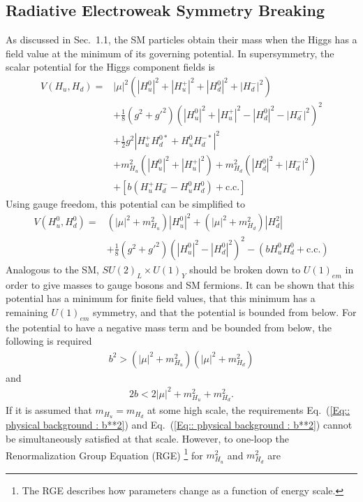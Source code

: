 \documentclass[twoside,english]{uiofysmaster}
\begin{document}
\subsection{Radiative Electroweak Symmetry Breaking}

As discussed in Sec.\ 1.1, the SM particles obtain their mass when the Higgs has a field value at the minimum of its governing potential. In supersymmetry, the scalar potential for the Higgs component fields is
\begin{align}
V(H_u, H_d) =& |\mu|^2 (|H_u^0|^2 + |H_u^+|^2 + |H_d^0|^2 + |H_d^-|^2) \nonumber \\
&+ \frac{1}{8} (g^2+{g'}^2)(|H_u^0|^2 + |H_u^+|^2 - |H_d^0|^2 - |H_d^-|^2)^2 \nonumber \\
&+ \frac{1}{2} g^2 |H_u^+H_d^{0*} + H_u^0H_d^{-*}|^2 \nonumber \\
&+ m_{H_u}^2 (|H_u^0|^2 + |H_u^+|^2) + m_{H_d}^2 (|H_d^0|^2 + |H_d^-|^2) \nonumber \\
&+ [b (H_u^+H_d^- - H_u^0 H_d^0) + \text{c.c.}]
\end{align}
Using gauge freedom, this potential can be simplified to 
\begin{align}
V(H_u^0, H_d^0) =& (|\mu|^2 + m_{H_u}^2) |H_u^0|^2 + (|\mu|^2 + m_{H_d}^2)|H_d^2| \nonumber \\
&+ \frac{1}{8}(g^2 + {g'}^2)(|H_u^0|^2 - |H_d^0|^2)^2 - (bH_u^0 H_d^0 + \text{c.c.})
\end{align}
Analogous to the SM, $SU(2)_L \times U(1)_Y$ should be broken down to $U(1)_{em}$ in order to give masses to gauge bosons and SM fermions. It can be shown that this potential has a minimum for finite field values, that this minimum has a remaining $U(1)_{em}$ symmetry, and that the potential is bounded from below. For the potential to have a negative mass term and be bounded from below, the following is required
\begin{align}\label{Eq:: physical background : b**2}
b^2 > (|\mu|^2 + m_{H_u}^2)(|\mu|^2 + m_{H_d}^2)
\end{align}
and
\begin{align}\label{Eq:: physical background : 2b}
2b < 2 |\mu|^2 + m_{H_u}^2 + m^2_{H_d}.
\end{align}
If it is assumed that $m_{H_u} = m_{H_d}$ at some high scale,  the requirements Eq.\ (\ref{Eq:: physical background : b**2}) and Eq.\ (\ref{Eq:: physical background : b**2}) cannot be simultaneously satisfied at that scale. However, to one-loop the Renormalization Group Equation (RGE) \footnote{The RGE describes how parameters change as a function of energy scale.} for $m_{H_u}^2$ and $m_{H_d}^2$ are 
\end{document}
